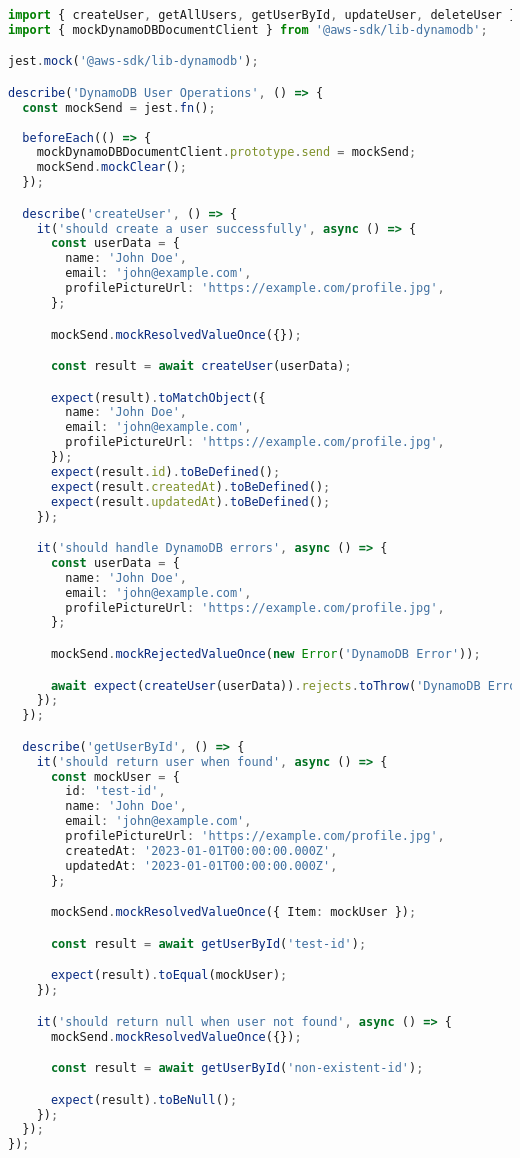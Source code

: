 \begin{lstlisting}[language=TypeScript, caption=Tests DynamoDB]
import { createUser, getAllUsers, getUserById, updateUser, deleteUser } from '@/lib/db/users-dynamodb';
import { mockDynamoDBDocumentClient } from '@aws-sdk/lib-dynamodb';

jest.mock('@aws-sdk/lib-dynamodb');

describe('DynamoDB User Operations', () => {
  const mockSend = jest.fn();
  
  beforeEach(() => {
    mockDynamoDBDocumentClient.prototype.send = mockSend;
    mockSend.mockClear();
  });

  describe('createUser', () => {
    it('should create a user successfully', async () => {
      const userData = {
        name: 'John Doe',
        email: 'john@example.com',
        profilePictureUrl: 'https://example.com/profile.jpg',
      };

      mockSend.mockResolvedValueOnce({});

      const result = await createUser(userData);

      expect(result).toMatchObject({
        name: 'John Doe',
        email: 'john@example.com',
        profilePictureUrl: 'https://example.com/profile.jpg',
      });
      expect(result.id).toBeDefined();
      expect(result.createdAt).toBeDefined();
      expect(result.updatedAt).toBeDefined();
    });

    it('should handle DynamoDB errors', async () => {
      const userData = {
        name: 'John Doe',
        email: 'john@example.com',
        profilePictureUrl: 'https://example.com/profile.jpg',
      };

      mockSend.mockRejectedValueOnce(new Error('DynamoDB Error'));

      await expect(createUser(userData)).rejects.toThrow('DynamoDB Error');
    });
  });

  describe('getUserById', () => {
    it('should return user when found', async () => {
      const mockUser = {
        id: 'test-id',
        name: 'John Doe',
        email: 'john@example.com',
        profilePictureUrl: 'https://example.com/profile.jpg',
        createdAt: '2023-01-01T00:00:00.000Z',
        updatedAt: '2023-01-01T00:00:00.000Z',
      };

      mockSend.mockResolvedValueOnce({ Item: mockUser });

      const result = await getUserById('test-id');

      expect(result).toEqual(mockUser);
    });

    it('should return null when user not found', async () => {
      mockSend.mockResolvedValueOnce({});

      const result = await getUserById('non-existent-id');

      expect(result).toBeNull();
    });
  });
});
\end{lstlisting}

